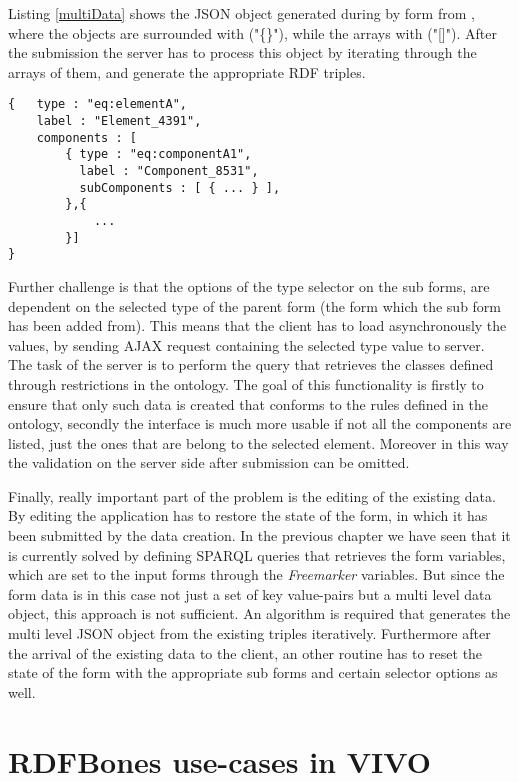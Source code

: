 Listing \ref{multiData} shows the JSON object generated during by form from , where the objects are surrounded with ("\{\}"), while the arrays with ("[]"). After the submission the server has to process this object by iterating through the arrays of them, and generate the appropriate RDF triples.

\begin{lstlisting}[basicstyle=\footnotesize, frame=single, caption={Multi level form data in JSON}, label=multiData, captionpos=b, belowskip=1em, aboveskip=2em]
{	type : "eq:elementA",
	label : "Element_4391",
	components : [
		{ type : "eq:componentA1",
		  label : "Component_8531",	
		  subComponents : [ { ... } ],
		},{ 
			... 
		}]
}
\end{lstlisting}

Further challenge is that the options of the type selector on the sub forms, are dependent on the selected type of the parent form (the form which the sub form has been added from). This means that the client has to load asynchronously the values, by sending AJAX request containing the selected type value to server. The task of the server is to perform the query that retrieves the classes defined through restrictions in the ontology. The goal of this functionality is firstly to ensure that only such data is created that conforms to the rules defined in the ontology, secondly the interface is much more usable if not all the components are listed, just the ones that are belong to the selected element. Moreover in this way the validation on the server side after submission can be omitted.

Finally, really important part of the problem is the editing of the existing data. By editing the application has to restore the state of the form, in which it has been submitted by the data creation. In the previous chapter we have seen that it is currently solved by defining  SPARQL queries that retrieves the form variables, which are set to the input forms through the \textit{Freemarker} variables. But since the form data is in this case not just a set of key value-pairs but a multi level data object, this approach is not sufficient. An algorithm is required that generates the multi level JSON object from the existing triples iteratively. Furthermore after the arrival of the existing data to the client, an other routine has to reset the state of the form with the appropriate sub forms and certain selector options as well.

\section{RDFBones use-cases in VIVO}

